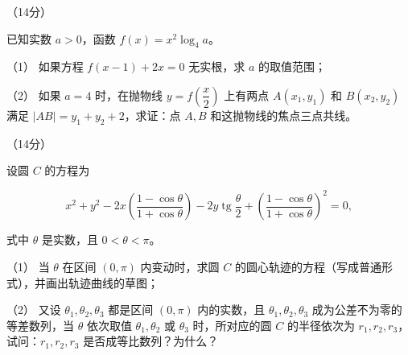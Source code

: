 \begin{question}
（14分）

已知实数 $a>0$，函数 $f(x)=x^2\log_4a$。

（1） 如果方程 $f(x-1)+2x=0$ 无实根，求 $a$ 的取值范围；

（2） 如果 $a=4$ 时，在抛物线 $y=f\left(\dfrac x2\right)$ 上有两点 $A(x_1,y_1)$ 和 $B(x_2,y_2)$ 满足 $|AB|=y_1+y_2+2$，求证：点 $A,B$ 和这抛物线的焦点三点共线。

\Needspace{0.4\textheight}
\end{question}
\begin{question}
（14分）

设圆 $C$ 的方程为

\nopagebreak[4]
\[
x^2+y^2-2x\left(\frac{1-\cos\theta}{1+\cos\theta}\right)-2y\operatorname{tg}\frac\theta2+\left(\frac{1-\cos\theta}{1+\cos\theta}\right)^2=0,
\]

式中 $\theta$ 是实数，且 $0<\theta<\pi$。

（1） 当 $\theta$ 在区间 $(0,\pi)$ 内变动时，求圆 $C$ 的圆心轨迹的方程（写成普通形式），并画出轨迹曲线的草图；

（2） 又设 $\theta_1,\theta_2,\theta_3$ 都是区间 $(0,\pi)$ 内的实数，且 $\theta_1,\theta_2,\theta_3$ 成为公差不为零的等差数列，当 $\theta$ 依次取值 $\theta_1,\theta_2$ 或 $\theta_3$ 时，所对应的圆 $C$ 的半径依次为 $r_1,r_2,r_3$，试问：$r_1,r_2,r_3$ 是否成等比数列？为什么？
\nopagebreak[4]
\begin{center}\end{center}
\nopagebreak[4]

\end{question}
